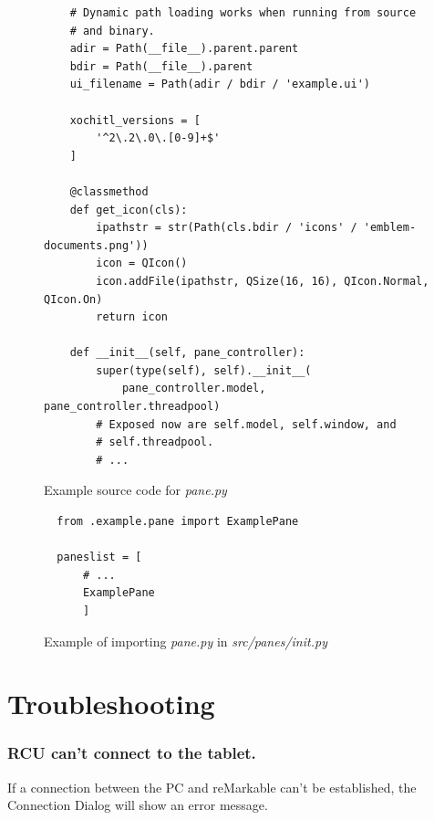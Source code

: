 \documentclass{memoir}
\begin{document}
{\begin{figure}[h]
\begin{verbatim}
    # Dynamic path loading works when running from source
    # and binary.
    adir = Path(__file__).parent.parent
    bdir = Path(__file__).parent
    ui_filename = Path(adir / bdir / 'example.ui')

    xochitl_versions = [
        '^2\.2\.0\.[0-9]+$'
    ]

    @classmethod
    def get_icon(cls):
        ipathstr = str(Path(cls.bdir / 'icons' / 'emblem-documents.png'))
        icon = QIcon()
        icon.addFile(ipathstr, QSize(16, 16), QIcon.Normal, QIcon.On)
        return icon

    def __init__(self, pane_controller):
        super(type(self), self).__init__(
            pane_controller.model, pane_controller.threadpool)
        # Exposed now are self.model, self.window, and
        # self.threadpool.
        # ...
\end{verbatim}
\caption{Example source code for \textit{pane.py}}
\label{fig:examplepanesource}
\end{figure}

\begin{figure}[h]
\begin{verbatim}
  from .example.pane import ExamplePane

  paneslist = [
      # ...
      ExamplePane
      ]
\end{verbatim}
\caption{Example of importing \textit{pane.py} in \textit{src/panes/\textunderscore \textunderscore init\textunderscore \textunderscore.py}}
\label{fig:examplepaneimport}
\end{figure}












\chapter{Troubleshooting}
\label{sec:troubleshooting}

\subsection{RCU can't connect to the tablet.}
If a connection between the PC and reMarkable can't be established, the Connection Dialog will show an error message.

}
\end{document}
